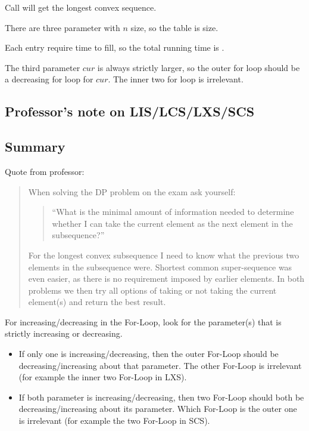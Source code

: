 Call  will get the longest convex sequence.

There are three parameter with $n$ size, so the table is  size.

Each entry require  time to fill, so the total running time is .

The third parameter $cur$ is always strictly larger, so the outer for loop
should be a decreasing for loop for $cur$. The inner two for loop is irrelevant.

\subsection{Professor's note on LIS/LCS/LXS/SCS}




\subsection{Summary}

Quote from professor:

\begin{quote}

When solving the DP problem on the exam ask yourself:

\begin{quote}
``What is the minimal amount of information needed to
determine whether I can take the current element as the
next element in the subsequence?''
\end{quote}

For the longest convex subsequence I need to know what the
previous two elements in the subsequence were. Shortest
common super-sequence was even easier, as there is no
requirement imposed by earlier elements. In both problems
we then try all options of taking or not taking the current
element(s) and return the best result.

\end{quote}

For increasing/decreasing in the For-Loop, look for the parameter(s)
that is strictly increasing or decreasing.
\begin{itemize}
    \item If only one is increasing/decreasing, then the outer For-Loop should
        be decreasing/increasing about that parameter.
        The other For-Loop is irrelevant (for example the inner two For-Loop in LXS).
    \item If both parameter is increasing/decreasing, then two For-Loop should
        both be decreasing/increasing about its parameter. Which For-Loop
        is the outer one is irrelevant (for example the two For-Loop in SCS).
\end{itemize}
